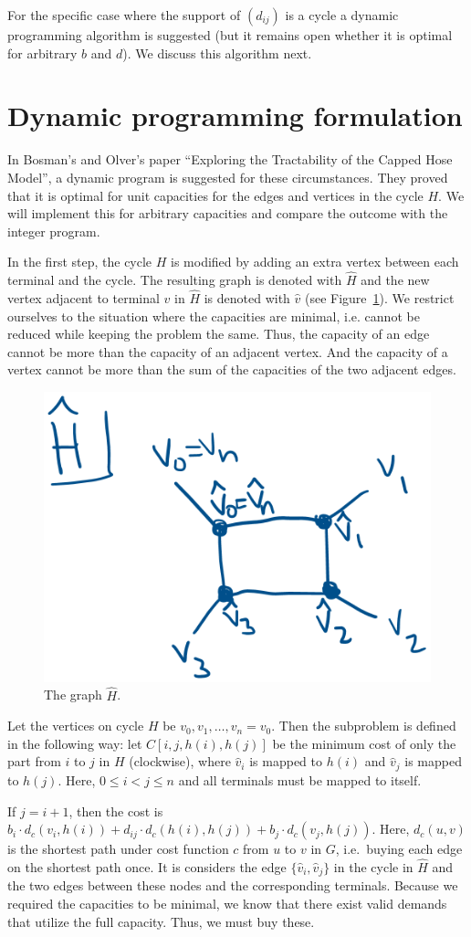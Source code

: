 \documentclass[11pt]{article}
\begin{document}
    For the specific case where the support of $(d_{ij})$ is a cycle a dynamic programming algorithm is suggested (but it remains open whether it is optimal for arbitrary $b$ and $d$).
    We discuss this algorithm next.

    \section{Dynamic programming formulation}
    In Bosman's and Olver's paper ``Exploring the Tractability of the Capped Hose Model'', a dynamic program is suggested for these circumstances.
    They proved that it is optimal for unit capacities for the edges and vertices in the cycle $H$.
    We will implement this for arbitrary capacities and compare the outcome with the integer program.

    In the first step, the cycle $H$ is modified by adding an extra vertex between each terminal and the cycle.
    The resulting graph is denoted with $\hat H$ and the new vertex adjacent to terminal $v$ in $\hat H$ is denoted with $\hat v$ (see Figure~\ref{fig:hdak}).
    We restrict ourselves to the situation where the capacities are minimal, i.e. cannot be reduced while keeping the problem the same.
    Thus, the capacity of an edge cannot be more than the capacity of an adjacent vertex.
    And the capacity of a vertex cannot be more than the sum of the capacities of the two adjacent edges.

    \begin{figure}
        \centering
        \includegraphics[width=.35\textwidth]{hdak.png}
        \caption{The graph $\hat H$.} \label{fig:hdak}
    \end{figure}

    Let the vertices on cycle $H$ be $v_0, v_1, \dots, v_n = v_0$.
    Then the subproblem is defined in the following way: let $C[i, j, h(i), h(j)]$ be the minimum cost of only the part from $i$ to $j$ in $H$ (clockwise), where $\hat v_i$ is mapped to $h(i)$ and $\hat v_j$ is mapped to $h(j)$.
    Here, $0 \le i < j \le n$ and all terminals must be mapped to itself.

    If $j = i + 1$, then the cost is $b_i \cdot d_c(v_i, h(i)) + d_{ij} \cdot d_c(h(i), h(j)) + b_j \cdot d_c(v_j, h(j))$.
    Here, $d_c(u, v)$ is the shortest path under cost function $c$ from $u$ to $v$ in $G$, i.e.\ buying each edge on the shortest path once.
    It is considers the edge $\{\hat v_i, \hat v_j\}$ in the cycle in $\hat H$ and the two edges between these nodes and the corresponding terminals.
    Because we required the capacities to be minimal, we know that there exist valid demands that utilize the full capacity.
    Thus, we must buy these.
\end{document}
